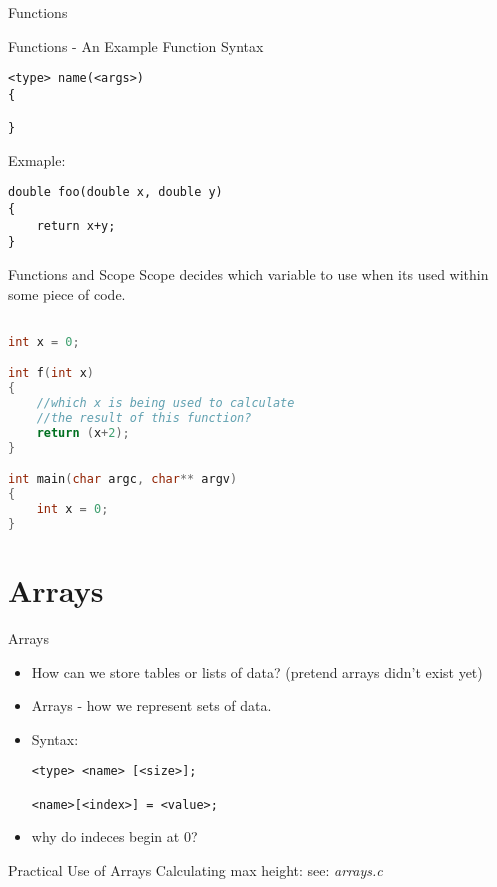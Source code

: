 \documentclass[main.tex]{subfiles}
\begin{document}
\begin{frame}{Functions}
	\begin{itemize}
	\end{itemize}
\end{frame}

\begin{frame}[fragile]{Functions - An Example}
	Function Syntax
	\begin{lstlisting}
<type> name(<args>)
{

}
	\end{lstlisting}
Exmaple: 
		\begin{lstlisting}
double foo(double x, double y)
{
	return x+y;
}
		\end{lstlisting}
\end{frame}

\begin{frame}[fragile]{Functions and Scope}
Scope decides which variable to use when its used within some piece of code.

	\begin{lstlisting}[language=c]

int x = 0;

int f(int x)
{
	//which x is being used to calculate 
	//the result of this function?
	return (x+2);
}

int main(char argc, char** argv)
{
	int x = 0;
}

	\end{lstlisting}
\end{frame}


\section{Arrays}
\label{sec:arrays}

\begin{frame}[fragile]{Arrays}
	\begin{itemize}
		\item How can we store tables or lists of data? (pretend arrays didn't exist
			yet)
		\item Arrays - how we represent sets of data.
		\item Syntax:
			\begin{lstlisting}
<type> <name> [<size>];

<name>[<index>] = <value>;
			\end{lstlisting}
		\item why do indeces begin at 0?
	\end{itemize}
\end{frame}

\begin{frame}[fragile]{Practical Use of Arrays}
	Calculating max height: see: \textit{arrays.c}
\end{frame}
\end{document}
